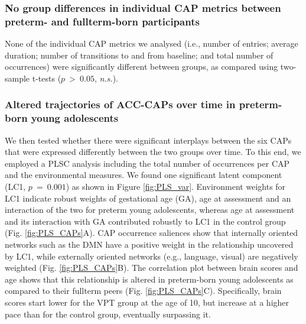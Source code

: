 \subsubsection*{No group differences in individual CAP metrics between preterm- and fullterm-born participants} None of the individual CAP metrics we analysed (i.e.,  number of entries; average duration; number of transitions to and from baseline; and total number of occurrences) were significantly different between groups, as compared using two-sample t-tests ($p~>~0.05$, \textit{n.s.}). 

\subsubsection*{Altered trajectories of ACC-CAPs over time in preterm-born young adolescents} We then tested whether there were significant interplays between the six CAPs that were expressed differently between the two groups over time. To this end, we employed a PLSC analysis including the total number of occurrences per CAP and the environmental measures. We found one significant latent component (LC1, $p~=~0.001$) as shown in Figure \ref{fig:PLS_var}. Environment weights for LC1  indicate robust weights of gestational age (GA), age at assessment and an interaction of the two for preterm young adolescents, whereas age at assessment and its interaction with GA contributed robustly to LC1 in the control group (Fig. \ref{fig:PLS_CAPs}A). CAP occurrence saliences show that internally oriented networks such as the DMN have a positive weight in the relationship uncovered by LC1, while externally oriented networks (e.g., language, visual) are negatively weighted (Fig. \ref{fig:PLS_CAPs}B). The correlation plot between brain scores and age shows that this relationship is altered in preterm-born young adolescents as compared to their fullterm peers (Fig. \ref{fig:PLS_CAPs}C). Specifically, brain scores start lower for the VPT group at the age of 10, but increase at a higher pace than for the control group, eventually surpassing it. 



